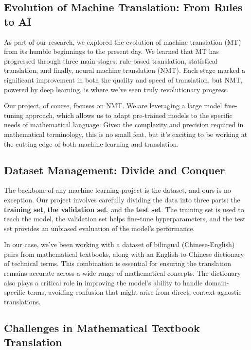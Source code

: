 \documentclass[a4paper]{article} 	%
\begin{document}
\subsection*{Evolution of Machine Translation: From Rules to AI}

As part of our research, we explored the evolution of machine translation (MT) from its humble beginnings to the present day. We learned that MT has progressed through three main stages: rule-based translation, statistical translation, and finally, neural machine translation (NMT). Each stage marked a significant improvement in both the quality and speed of translation, but NMT, powered by deep learning, is where we’ve seen truly revolutionary progress.

Our project, of course, focuses on NMT. We are leveraging a large model fine-tuning approach, which allows us to adapt pre-trained models to the specific needs of mathematical language. Given the complexity and precision required in mathematical terminology, this is no small feat, but it’s exciting to be working at the cutting edge of both machine learning and translation.

\subsection*{Dataset Management: Divide and Conquer}

The backbone of any machine learning project is the dataset, and ours is no exception. Our project involves carefully dividing the data into three parts: the \textbf{training set}, \textbf{the validation set}, and the \textbf{test set}. The training set is used to teach the model, the validation set helps fine-tune hyperparameters, and the test set provides an unbiased evaluation of the model’s performance.

In our case, we’ve been working with a dataset of bilingual (Chinese-English) pairs from mathematical textbooks, along with an English-to-Chinese dictionary of technical terms. This combination is essential for ensuring the translation remains accurate across a wide range of mathematical concepts. The dictionary also plays a critical role in improving the model’s ability to handle domain-specific terms, avoiding confusion that might arise from direct, context-agnostic translations.

\subsection*{Challenges in Mathematical Textbook Translation}
\end{document}
